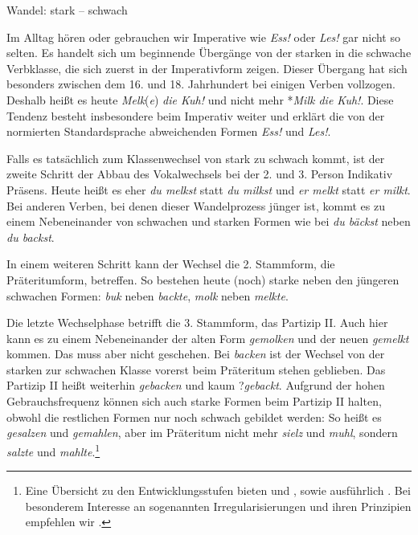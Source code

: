 \begin{Exkurs}{Wandel: stark -- schwach}\label{Exkurs:WandelVerbflexion}
    
Im Alltag hören oder gebrauchen wir Imperative wie \textit{Ess!} oder \textit{Les!} gar nicht so selten. Es handelt sich um beginnende Übergänge von der starken in die schwache Verbklasse, die sich zuerst in der Imperativform zeigen. Dieser Übergang hat sich besonders zwischen dem 16. und 18. Jahrhundert bei einigen Verben vollzogen. Deshalb heißt es heute \textit{Melk}(\textit{e}) \textit{die Kuh!} und nicht mehr *\textit{Milk die Kuh!}. Diese Tendenz besteht insbesondere beim Imperativ weiter und erklärt die von der normierten Standardsprache abweichenden Formen \textit{Ess!} und \textit{Les!}.

Falls es tatsächlich zum Klassenwechsel von stark zu schwach kommt, ist der zweite Schritt der Abbau des Vokalwechsels bei der 2. und 3. Person Indikativ Präsens. Heute heißt es eher \textit{du melkst} statt \textit{du milkst} und \textit{er melkt} statt \textit{er milkt}. Bei anderen Verben, bei denen dieser Wandelprozess jünger ist, kommt es zu einem Nebeneinander von schwachen und starken Formen wie bei \textit{du bäckst} neben \textit{du backst}. 

In einem weiteren Schritt kann der Wechsel die 2. Stammform, die Präteritumform, betreffen. So bestehen heute (noch) starke neben den jüngeren schwachen Formen: \textit{buk} neben \textit{backte}, \textit{molk} neben \textit{melkte}. 

Die letzte Wechselphase betrifft die 3. Stammform, das Partizip II. Auch hier kann es zu einem Nebeneinander der alten Form \textit{gemolken} und der neuen \textit{gemelkt} kommen. Das muss aber nicht geschehen. Bei \textit{backen} ist der Wechsel von der starken zur schwachen Klasse vorerst beim Präteritum stehen geblieben. Das Partizip II heißt weiterhin \textit{gebacken} und kaum ?\textit{gebackt}. Aufgrund der hohen Gebrauchsfrequenz können sich auch starke Formen beim Partizip II halten, obwohl die restlichen Formen nur noch schwach gebildet werden: So heißt es \textit{gesalzen} und \textit{gemahlen}, aber im Präteritum nicht mehr \textit{sielz} und \textit{muhl}, sondern \textit{salzte} und \textit{mahlte}.\footnote{Eine Übersicht zu den Entwicklungsstufen bieten \citet[60--67]{Damel2013} und \citet[287--292]{Nuebling_et_al_2017}, sowie ausführlich \citet{Bittner_A_1996}. Bei besonderem Interesse an sogenannten Irregularisierungen und ihren Prinzipien empfehlen wir \citet{Nuebling2000}.}


\end{Exkurs}
